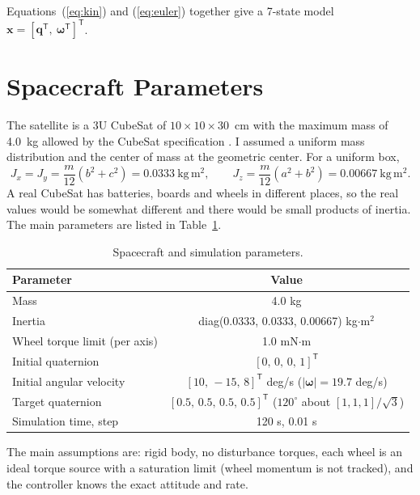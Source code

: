 \documentclass[letterpaper,10pt]{article}
\newcommand{\vv}[1]{\bm{#1}}
\newcommand{\Tp}{^{\mathsf{T}}}
\begin{document}
Equations~(\ref{eq:kin}) and (\ref{eq:euler}) together give a 7-state model
$\vv{x} = [\vv{q}\Tp,\ \vv{\omega}\Tp]\Tp$.

\section{Spacecraft Parameters}

The satellite is a 3U CubeSat of $10\times10\times30$~cm with the maximum
mass of 4.0~kg allowed by the CubeSat specification \cite{cds}. I assumed a
uniform mass distribution and the center of mass at the geometric center.
For a uniform box,
\begin{equation}
  J_x = J_y = \frac{m}{12}(b^2 + c^2) = 0.0333~\mathrm{kg\,m^2}, \qquad
  J_z = \frac{m}{12}(a^2 + b^2) = 0.00667~\mathrm{kg\,m^2}.
\end{equation}
A real CubeSat has batteries, boards and wheels in different places, so the
real values would be somewhat different and there would be small products of
inertia. The main parameters are listed in Table~\ref{tab:params}.

\begin{table}[htbp]
\centering
\caption{Spacecraft and simulation parameters.}
\label{tab:params}
\begin{tabular}{@{}lc@{}}
\toprule
Parameter & Value \\
\midrule
Mass & 4.0 kg \\
Inertia & diag(0.0333, 0.0333, 0.00667) kg$\cdot$m$^2$ \\
Wheel torque limit (per axis) & 1.0 mN$\cdot$m \\
Initial quaternion & $[0,\,0,\,0,\,1]\Tp$ \\
Initial angular velocity & $[10,\,-15,\,8]\Tp$ deg/s ($|\vv{\omega}| = 19.7$ deg/s) \\
Target quaternion & $[0.5,\,0.5,\,0.5,\,0.5]\Tp$ ($120^\circ$ about $[1,1,1]/\sqrt3$) \\
Simulation time, step & 120 s, 0.01 s \\
\bottomrule
\end{tabular}
\end{table}

The main assumptions are: rigid body, no disturbance torques, each wheel is
an ideal torque source with a saturation limit (wheel momentum is not
tracked), and the controller knows the exact attitude and rate.

\end{document}
